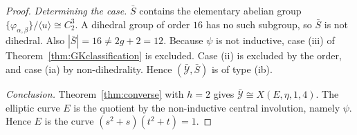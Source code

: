 \documentclass[11pt]{article}
\theoremstyle{remark}
\begin{document}
\begin{proof}
\emph{Determining the case.} $\bar S$ contains the elementary abelian
group $\{\varphi_{\alpha,\beta}\}/\langle u\rangle\cong C_2^3$. A
dihedral group of order $16$ has no such subgroup, so $\bar S$ is not
dihedral. Also $|\bar S|=16\neq2g+2=12$. Because $\psi$ is not
inductive, case \textup{(iii)} of Theorem~\ref{thm:GKclassification} is
excluded. Case \textup{(ii)} is excluded by the order, and case
\textup{(ia)} by non-dihedrality. Hence $(\bar{\mathcal Y},\bar S)$ is
of type \textup{(ib)}.

\emph{Conclusion.} Theorem~\ref{thm:converse} with $h=2$ gives
$\bar{\mathcal Y}\cong X(E,\eta,1,4)$. The elliptic curve $E$ is the
quotient by the non-inductive central involution, namely $\psi$. Hence
$E$ is the curve $(s^2+s)(t^2+t)=1$.
\end{proof}
\end{document}
